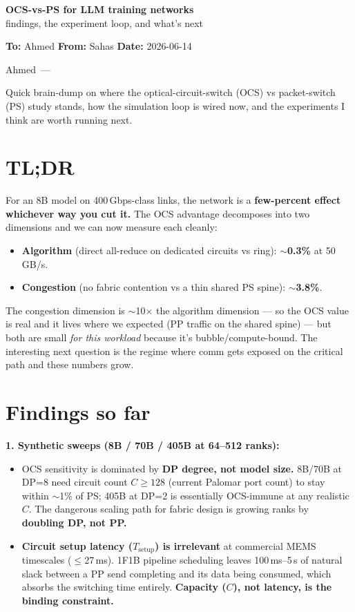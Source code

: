 \documentclass[11pt]{article}
\begin{document}
\begin{center}
{\Large\bfseries OCS-vs-PS for LLM training networks}\\[2pt]
{\normalsize findings, the experiment loop, and what's next}
\end{center}

\vspace{4pt}
\textbf{To:} Ahmed \hfill \textbf{From:} Sahas \hfill \textbf{Date:} 2026-06-14

\vspace{6pt}
Ahmed~---

Quick brain-dump on where the optical-circuit-switch (OCS) vs packet-switch (PS) study stands, how the simulation loop is wired now, and the experiments I think are worth running next.

\section*{TL;DR}

For an 8B model on 400\,Gbps-class links, the network is a \textbf{few-percent effect whichever way you cut it.} The OCS advantage decomposes into two dimensions and we can now measure each cleanly:

\begin{itemize}
\item \textbf{Algorithm} (direct all-reduce on dedicated circuits vs ring): \textbf{$\sim$0.3\%} at 50\,GB/s.
\item \textbf{Congestion} (no fabric contention vs a thin shared PS spine): \textbf{$\sim$3.8\%}.
\end{itemize}

The congestion dimension is $\sim$10$\times$ the algorithm dimension --- so the OCS value is real and it lives where we expected (PP traffic on the shared spine) --- but both are small \textit{for this workload} because it's bubble/compute-bound. The interesting next question is the regime where comm gets exposed on the critical path and these numbers grow.

\section*{Findings so far}

\textbf{1. Synthetic sweeps (8B / 70B / 405B at 64--512 ranks):}
\begin{itemize}
\item OCS sensitivity is dominated by \textbf{DP degree, not model size.} 8B/70B at DP=8 need circuit count $C \geq 128$ (current Palomar port count) to stay within $\sim$1\% of PS; 405B at DP=2 is essentially OCS-immune at any realistic $C$. The dangerous scaling path for fabric design is growing ranks by \textbf{doubling DP, not PP.}
\item \textbf{Circuit setup latency ($T_{\text{setup}}$) is irrelevant} at commercial MEMS timescales ($\leq$27\,ms). 1F1B pipeline scheduling leaves 100\,ms--5\,s of natural slack between a PP send completing and its data being consumed, which absorbs the switching time entirely. \textbf{Capacity ($C$), not latency, is the binding constraint.}
\end{itemize}
\end{document}
